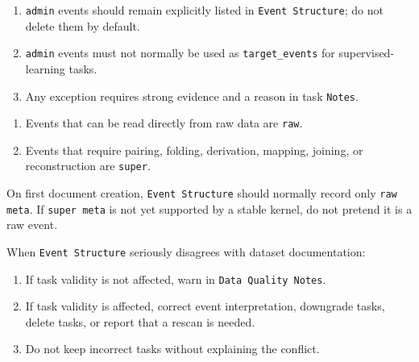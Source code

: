 \begin{tcolorbox}
\smallskip{}\par\smallskip

\begin{enumerate}[leftmargin=1.5em,noitemsep,topsep=2pt]
\item \texttt{admin} events should remain explicitly listed in \texttt{Event Structure}; do not delete them by default.
\item \texttt{admin} events must not normally be used as \texttt{target\_events} for supervised-learning tasks.
\item Any exception requires strong evidence and a reason in task \texttt{Notes}.
\end{enumerate}

\smallskip{}\par\smallskip

\begin{enumerate}[leftmargin=1.5em,noitemsep,topsep=2pt]
\item Events that can be read directly from raw data are \texttt{raw}.
\item Events that require pairing, folding, derivation, mapping, joining, or reconstruction are \texttt{super}.
\end{enumerate}

\smallskip{}\par\smallskip

\noindent On first document creation, \texttt{Event Structure} should normally record only \texttt{raw meta}. If \texttt{super meta} is not yet supported by a stable kernel, do not pretend it is a raw event.\par\smallskip

\smallskip{}\par\smallskip

\noindent When \texttt{Event Structure} seriously disagrees with dataset documentation:\par\smallskip

\begin{enumerate}[leftmargin=1.5em,noitemsep,topsep=2pt]
\item If task validity is not affected, warn in \texttt{Data Quality Notes}.
\item If task validity is affected, correct event interpretation, downgrade tasks, delete tasks, or report that a rescan is needed.
\item Do not keep incorrect tasks without explaining the conflict.
\end{enumerate}


\end{tcolorbox}
